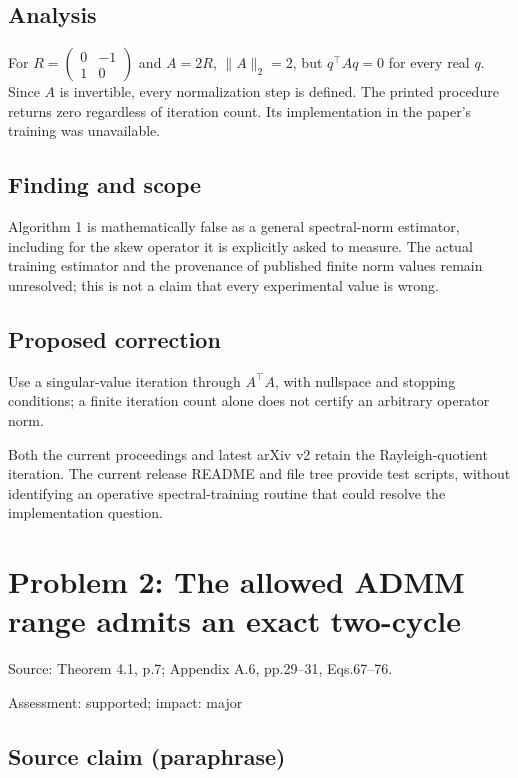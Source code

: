 \documentclass[11pt]{article}
\begin{document}
\subsection*{Analysis}

For \(R=\begin{pmatrix}0&-1\\1&0\end{pmatrix}\) and \(A=2R\), \(\|A\|_2=2\), but \(q^\top Aq=0\) for every real \(q\). Since \(A\) is invertible, every normalization step is defined. The printed procedure returns zero regardless of iteration count. Its implementation in the paper's training was unavailable.

\subsection*{Finding and scope}

Algorithm 1 is mathematically false as a general spectral-norm estimator, including for the skew operator it is explicitly asked to measure. The actual training estimator and the provenance of published finite norm values remain unresolved; this is not a claim that every experimental value is wrong.

\subsection*{Proposed correction}

Use a singular-value iteration through \(A^\top A\), with nullspace and stopping conditions; a finite iteration count alone does not certify an arbitrary operator norm.

Both the current proceedings and latest arXiv v2 retain the Rayleigh-quotient iteration. The current release README and file tree provide test scripts, without identifying an operative spectral-training routine that could resolve the implementation question.

\section*{Problem 2: The allowed ADMM range admits an exact two-cycle}

Source: Theorem 4.1, p.7; Appendix A.6, pp.29–31, Eqs.67–76.

Assessment: supported; impact: major

\subsection*{Source claim (paraphrase)}
\end{document}

